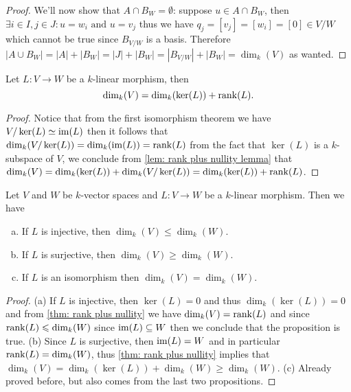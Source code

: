 \begin{proof}
  We'll now show that \(A \cap B_W = \emptyset\): suppose \(u \in A \cap B_W\),
  then \(\exists i \in I, j \in J : u = w_i \text{ and } u = v_j\) thus we have
  \(q_j = [v_j] = [w_i] = [0] \in V/W\) which cannot be true since \(B_{V/W}\)
  is a basis. Therefore \(|A \cup B_W| = |A| + |B_W| = |J| + |B_W| =  |B_{V/W}|
  + |B_W| = \dim_k(V)\) as wanted.
\end{proof}

\begin{theorem}\label{thm: rank plus nullity}
  Let \(L : V \to W\) be a \(k\)-linear morphism, then
  \[
    \dim_k(V) = \dim_k(\ker(L)) + \operatorname{rank}(L).
  \]
\end{theorem}

\begin{proof}
  Notice that from the first isomorphism theorem we have \(V/\ker(L) \simeq
  \operatorname{im}(L)\) then it follows that \(\dim_k(V/\ker(L)) = \dim_k(\operatorname{im}(L)) =
  \operatorname{rank}(L)\) from the fact that \(\ker(L)\) is a \(k\)-subspace of \(V\), we
  conclude from \cref{lem: rank plus nullity lemma} that \(\dim_k(V) =
  \dim_k(\ker(L)) + \dim_k(V/\ker(L)) = \dim_k(\ker(L)) + \operatorname{rank}(L)\).
\end{proof}

\begin{corollary}
  Let \(V\) and \(W\) be \(k\)-vector spaces and \(L : V \to W\) be a
  \(k\)-linear morphism. Then we have
  \begin{enumerate}[(a).]
    \item If \(L\) is injective, then \(\dim_k(V) \leq \dim_k(W)\).
    \item If \(L\) is surjective, then \(\dim_k(V) \geq \dim_k(W)\).
    \item If \(L\) is an isomorphism then \(\dim_k(V) = \dim_k(W)\).
  \end{enumerate}
\end{corollary}

\begin{proof}
  (a) If \(L\) is injective, then \(\ker(L) = 0\) and thus \(\dim_k(\ker(L)) =
  0\) and from \cref{thm: rank plus nullity} we have \(\dim_k(V) = \operatorname{rank}(L)\) and
  since \(\operatorname{rank}(L) \leqslant \dim_k(W)\) since \(\operatorname{im}(L) \subseteq W\) then we
  conclude that the proposition is true. (b) Since \(L\) is surjective, then
  \(\operatorname{im}(L) = W\) and in particular \(\operatorname{rank}(L) = \dim_k(W)\), thus \cref{thm: rank
  plus nullity} implies that  \(\dim_k(V) = \dim_k(\ker(L)) + \dim_k(W) \geq
  \dim_k(W)\). (c) Already proved before, but also comes from the last two
  propositions.
\end{proof}

